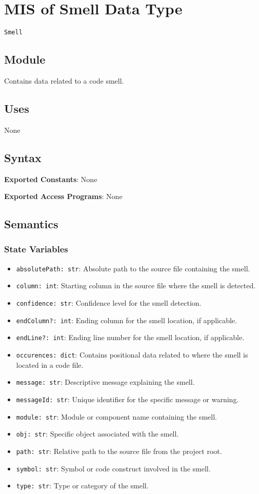 \documentclass[12pt, titlepage]{article}
\begin{document}
\section{MIS of Smell Data Type} \label{mis:smell}
\texttt{Smell}

\subsection{Module}
Contains data related to a code smell.

\subsection{Uses}
None

\subsection{Syntax}
\noindent
\textbf{Exported Constants}: None

\noindent
\textbf{Exported Access Programs}: None

\subsection{Semantics}

\subsubsection{State Variables}
\begin{itemize}
  \item \texttt{absolutePath: str}: Absolute path to the source file containing the smell.
  \item \texttt{column: int}: Starting column in the source file where the smell is detected.
  \item \texttt{confidence: str}: Confidence level for the smell detection.
  \item \texttt{endColumn?: int}: Ending column for the smell location, if applicable.
  \item \texttt{endLine?: int}: Ending line number for the smell location, if applicable.
  \item \texttt{occurences: dict}: Contains positional data related to where the smell is located in a code file.
  \item \texttt{message: str}: Descriptive message explaining the smell.
  \item \texttt{messageId: str}: Unique identifier for the specific message or warning.
  \item \texttt{module: str}: Module or component name containing the smell.
  \item \texttt{obj: str}: Specific object associated with the smell.
  \item \texttt{path: str}: Relative path to the source file from the project root.
  \item \texttt{symbol: str}: Symbol or code construct involved in the smell.
  \item \texttt{type: str}: Type or category of the smell.
\end{itemize}
\end{document}
